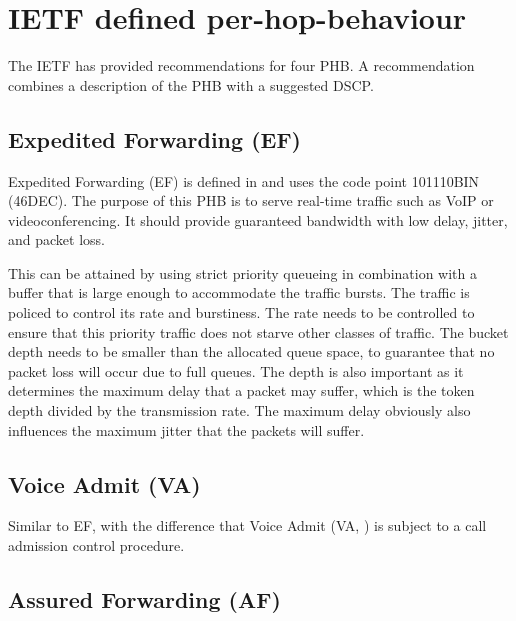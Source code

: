 \section{IETF defined per-hop-behaviour}
The IETF has provided recommendations for four PHB.
A recommendation combines a description of the PHB with a suggested DSCP.


\subsection{Expedited Forwarding (EF)}
Expedited Forwarding (EF) is defined in \cite{rfc3246} and uses the code point 101110BIN (46DEC).
The purpose of this PHB is to serve real-time traffic such as VoIP or videoconferencing.
It should provide guaranteed bandwidth with low delay, jitter, and packet loss.

This can be attained by using strict priority queueing in combination with a buffer that is large enough to accommodate the traffic bursts.
The traffic is policed to control its rate and burstiness.
The rate needs to be controlled to ensure that this priority traffic does not starve other classes of traffic.
The bucket depth needs to be smaller than the allocated queue space, to guarantee that no packet loss will occur due to full queues.
The depth is also important as it determines the maximum delay that a packet may suffer, which is the token depth divided by the transmission rate.
The maximum delay obviously also influences the maximum jitter that the packets will suffer.

\subsection{Voice Admit (VA)}

Similar to EF, with the difference that Voice Admit (VA, \cite{rfc5865}) is subject to a call admission control procedure.

\subsection{Assured Forwarding (AF)}
